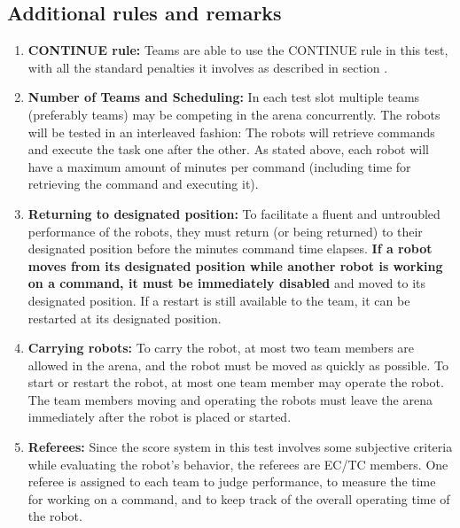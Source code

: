 \subsection{Additional rules and remarks}
\label{sec:eegpsr-remarks}
\begin{enumerate}
	\item \textbf{CONTINUE rule:} Teams are able to use the CONTINUE rule in this test, with all the standard penalties it involves as described in section .

	\item \textbf{Number of Teams and Scheduling:} In each test slot multiple teams (preferably \eegpsrTeams teams) may be competing in the arena concurrently. The robots will be tested in an interleaved fashion: The robots will retrieve commands and execute the task one after the other. As stated above, each robot will have a maximum amount of \eegpsrMaxCmdTime minutes per command (including time for retrieving the command and executing it). \\
	
	\item \textbf{Returning to designated position:} To facilitate a fluent and untroubled performance of the robots, they must return (or being returned) to their designated position before the \eegpsrMaxCmdTime minutes command time elapses. \textbf{If a robot moves from its designated position while another robot is working on a command, it must be immediately disabled} and moved to its designated position. If a restart is still available to the team, it can be restarted at its designated position. \\

	\item \textbf{Carrying robots:}	To carry the robot, at most two team members are allowed in the arena, and the robot must be moved as quickly as possible. To start or restart the robot, at most one team member may operate the robot. The team members moving and operating the robots must leave the arena immediately after the robot is placed or started. \\

	\item \textbf{Referees:} Since the score system in this test involves some subjective criteria while evaluating the robot's behavior, the referees are EC/TC members. One referee is assigned to each team to judge performance, to measure the time for working on a command, and to keep track of the overall operating time of the robot. \\


\end{enumerate}
